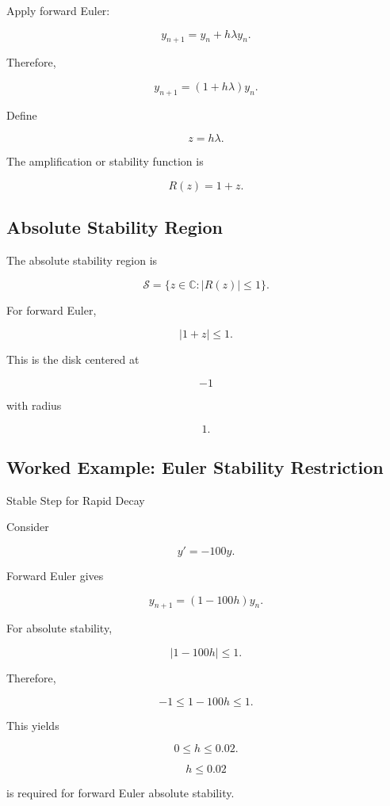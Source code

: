 Apply forward Euler:

\[
y_{n+1}
=
y_n+h\lambda y_n.
\]

Therefore,

\[
\boxed{
y_{n+1}
=
(1+h\lambda)y_n.
}
\]

Define

\[
z=h\lambda.
\]

The amplification or stability function is

\[
\boxed{
R(z)=1+z.
}
\]

\subsection{Absolute Stability Region}
\label{subsec:absolute-stability-region}

The absolute stability region is

\[
\boxed{
\mathcal{S}
=
\{
z\in\mathbb{C}
:
|R(z)|\leq1
\}.
}
\]

For forward Euler,

\[
\boxed{
|1+z|
\leq1.
}
\]

This is the disk centered at

\[
-1
\]

with radius

\[
1.
\]

\subsection{Worked Example: Euler Stability Restriction}
\label{subsec:worked-euler-stability}

\begin{workedexamplebox}{Stable Step for Rapid Decay}

Consider

\[
y'=-100y.
\]

Forward Euler gives

\[
y_{n+1}
=
(1-100h)y_n.
\]

For absolute stability,

\[
|1-100h|
\leq1.
\]

Therefore,

\[
-1
\leq
1-100h
\leq
1.
\]

This yields

\[
0
\leq
h
\leq
0.02.
\]

\begin{answerbox}
\[
\boxed{
h\leq0.02
}
\]

is required for forward Euler absolute stability.
\end{answerbox}

\end{workedexamplebox}

